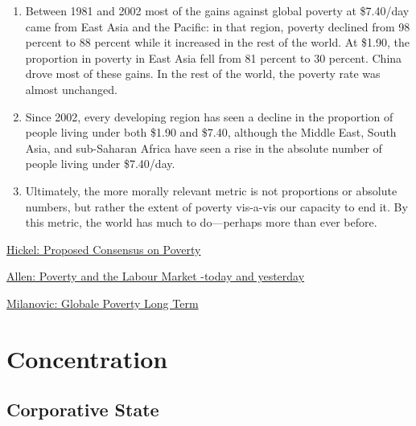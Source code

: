 \documentclass[
]{book}
\begin{document}
\begin{enumerate}
\def\labelenumi{\arabic{enumi}.}
\setcounter{enumi}{7}
\item
  Between 1981 and 2002 most of the gains against global poverty at \$7.40/day came from East Asia and the Pacific: in that region, poverty declined from 98 percent to 88 percent while it increased in the rest of the world. At \$1.90, the proportion in poverty in East Asia fell from 81 percent to 30 percent. China drove most of these gains. In the rest of the world, the poverty rate was almost unchanged.
\item
  Since 2002, every developing region has seen a decline in the proportion of people living under both \$1.90 and \$7.40, although the Middle East, South Asia, and sub-Saharan Africa have seen a rise in the absolute number of people living under \$7.40/day.
\item
  Ultimately, the more morally relevant metric is not proportions or absolute numbers, but rather the extent of poverty vis-a-vis our capacity to end it. By this metric, the world has much to do---perhaps more than ever before.
\end{enumerate}

\href{https://www.cgdev.org/blog/12-things-we-can-agree-about-global-poverty}{Hickel: Proposed Consensus on Poverty}

\href{https://en.es1lib.org/book/11926264/191b2c}{Allen: Poverty and the Labour Market -today and yesterday}

\href{https://www.globalpolicyjournal.com/blog/11/02/2019/global-poverty-over-long-term-legitimate-issues}{Milanovic: Globale Poverty Long Term}

\hypertarget{concentration}{%
\chapter{Concentration}\label{concentration}}

\hypertarget{corporative-state}{%
\section{Corporative State}\label{corporative-state}}
\end{document}

